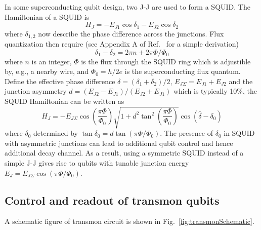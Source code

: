 \documentclass[%
groupedaddress,
showpacs,
 amsmath,amssymb,
 aps,
prb,
]{revtex4-1}
\begin{document}
    In some superconducting qubit design, two J-J are used to form a SQUID. The Hamiltonian of a SQUID is\cite{koch2007charge}
    \begin{equation}
        H_J = -E_{J1}\cos \delta_1 -E_{J2}\cos \delta_2
    \end{equation}
    where $ \delta_{1,2} $ now describe the phase difference across the junctions. Flux quantization then require (see Appendix A of Ref.~ for a simple derivation)
    \begin{equation}
        \delta_1 - \delta_2 = 2 \pi n + 2 \pi \Phi/\Phi_0
    \end{equation}
    where $n$ is an integer, $\Phi $ is the flux through the SQUID ring which is adjustible by, e.g.,  a nearby wire, and $ \Phi_0 =h/2e  $ is the superconducting flux quantum. Define the effective phase difference $ \delta = (\delta_1+\delta_2)/2 $, $E_{J \Sigma} = E_{J1} + E_{J2} $ and the junction asymmetry $d = (E_{J2}- E_{J1})/(E_{J2}+E_{J1}) $ which is typically 10\%, the SQUID Hamiltonian can be written as\cite{koch2007charge}
    \begin{equation}
        H_J = - E_{J \Sigma} \cos \left (\frac{\pi \Phi}{\Phi_0} \right )\sqrt{ 1+d^2 \tan^2 \left (\frac{\pi \Phi}{\Phi_0} \right ) }\cos(\hat \delta - \delta_0)
    \end{equation}
    where $ \delta_0 $ determined by $ \tan \delta_0 = d \tan(\pi \Phi/\Phi_0) $. The presence of $ \delta_0 $ in SQUID with asymmetric junctions can lead to additional qubit control and hence additional decay channel. As a result, using a symmetric SQUID instead of a simple J-J gives rise to qubits with tunable junction energy $ E_J = E_{J \Sigma} \cos(\pi \Phi/\Phi_0) $.

        
    

    \subsection{Control and readout of transmon qubits} %
    \label{sub:control_and_readout_of_transmon_qubits}

        A schematic figure of transmon circuit is shown in Fig.~\ref{fig:transmonSchematic}.
\end{document}

